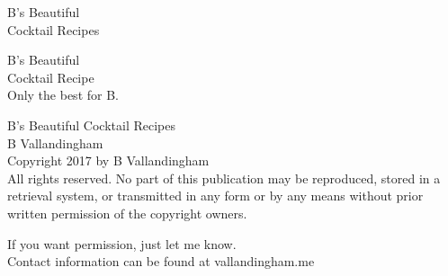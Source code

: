 \documentclass[12pt]{book}
\newcommand\blankpage{%
    \null
    \thispagestyle{empty}%
    \addtocounter{page}{-1}%
    \newpage}
\begin{document}




  \pagestyle{empty}
  \vspace*{\fill}
  \begin{center}
  \huge{\textsf{B's Beautiful}}\\
  \huge{\textsf{Cocktail Recipes}}\\[0.5cm]
  \end{center}
  \vspace*{\fill}

  \begin{titlepage}
    \vspace*{\fill}
    \begin{center}
      \huge{\textsf{B's Beautiful}}\\
      \huge{\textsf{Cocktail Recipe}}\\[0.5cm]
      \vspace*{\fill}
      \large {Only the best for B.}\\[0.4cm]
    \end{center}
    \vspace*{\fill}
  \end{titlepage}

  \begingroup
  \footnotesize
  \parindent 0pt
  \parskip \baselineskip
  \vfill
  B's Beautiful Cocktail Recipes\\
  B Vallandingham \\


  Copyright \textcopyright{} 2017 by B Vallandingham \\

  All rights reserved. No part of this publication may be reproduced, stored in a retrieval system, or transmitted in any form or by any means without prior written permission of the copyright owners.

  If you want permission, just let me know.\\
  Contact information can be found at vallandingham.me
\end{document}
